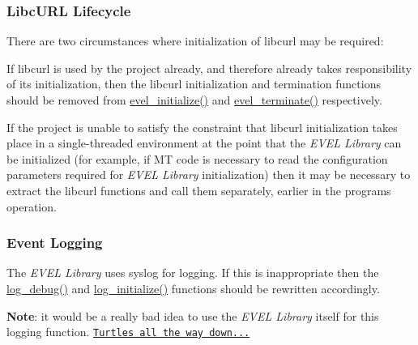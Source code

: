 \subsubsection*{Libc\+U\+RL Lifecycle}

There are two circumstances where initialization of libcurl may be required\+:


\begin{DoxyEnumerate}
\item If libcurl is used by the project already, and therefore already takes responsibility of its initialization, then the libcurl initialization and termination functions should be removed from \hyperlink{evel_8c_a059033f948f5bf406fedb4a7ef1966da}{evel\+\_\+initialize()} and \hyperlink{evel_8c_ab3f6225ddb9c5113d74503d4fcd17e5b}{evel\+\_\+terminate()} respectively.
\item If the project is unable to satisfy the constraint that libcurl initialization takes place in a single-\/threaded environment at the point that the {\itshape E\+V\+EL Library} can be initialized (for example, if MT code is necessary to read the configuration parameters required for {\itshape E\+V\+EL Library} initialization) then it may be necessary to extract the libcurl functions and call them separately, earlier in the program\textquotesingle{}s operation.
\end{DoxyEnumerate}

\subsubsection*{Event Logging}

The {\itshape E\+V\+EL Library} uses {\ttfamily syslog} for logging. If this is inappropriate then the \hyperlink{evel_8h_ab6073d0ad433cc7e272b66952063a4fb}{log\+\_\+debug()} and \hyperlink{evel_8h_a7e62b4de31e7c058e1534d0ac6040e98}{log\+\_\+initialize()} functions should be rewritten accordingly.

{\bfseries Note}\+: it would be a really bad idea to use the {\itshape E\+V\+EL Library} itself for this logging function. \href{https://en.wikipedia.org/wiki/Turtles_all_the_way_down}{\tt Turtles all the way down...} 